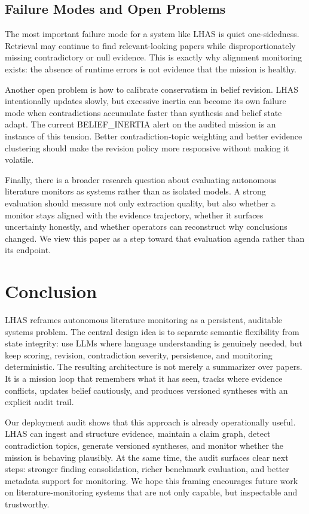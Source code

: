 \documentclass[manuscript,screen,review]{jair}
\begin{document}
\subsection{Failure Modes and Open Problems}
The most important failure mode for a system like LHAS is quiet one-sidedness. Retrieval may continue to find relevant-looking papers while disproportionately missing contradictory or null evidence. This is exactly why alignment monitoring exists: the absence of runtime errors is not evidence that the mission is healthy.

Another open problem is how to calibrate conservatism in belief revision. LHAS intentionally updates slowly, but excessive inertia can become its own failure mode when contradictions accumulate faster than synthesis and belief state adapt. The current BELIEF\_INERTIA alert on the audited mission is an instance of this tension. Better contradiction-topic weighting and better evidence clustering should make the revision policy more responsive without making it volatile.

Finally, there is a broader research question about evaluating autonomous literature monitors as systems rather than as isolated models. A strong evaluation should measure not only extraction quality, but also whether a monitor stays aligned with the evidence trajectory, whether it surfaces uncertainty honestly, and whether operators can reconstruct why conclusions changed. We view this paper as a step toward that evaluation agenda rather than its endpoint.

\section{Conclusion}
LHAS reframes autonomous literature monitoring as a persistent, auditable systems problem. The central design idea is to separate semantic flexibility from state integrity: use LLMs where language understanding is genuinely needed, but keep scoring, revision, contradiction severity, persistence, and monitoring deterministic. The resulting architecture is not merely a summarizer over papers. It is a mission loop that remembers what it has seen, tracks where evidence conflicts, updates belief cautiously, and produces versioned syntheses with an explicit audit trail.

Our deployment audit shows that this approach is already operationally useful. LHAS can ingest and structure evidence, maintain a claim graph, detect contradiction topics, generate versioned syntheses, and monitor whether the mission is behaving plausibly. At the same time, the audit surfaces clear next steps: stronger finding consolidation, richer benchmark evaluation, and better metadata support for monitoring. We hope this framing encourages future work on literature-monitoring systems that are not only capable, but inspectable and trustworthy.
\end{document}
